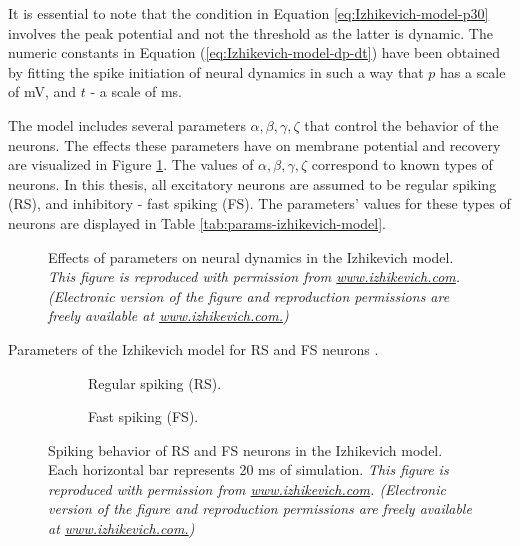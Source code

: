 It is essential to note that the condition in Equation \ref{eq:Izhikevich-model-p30} involves the peak potential and not the threshold as the latter is dynamic.
The numeric constants in Equation (\ref{eq:Izhikevich-model-dp-dt}) have been obtained by fitting the spike initiation of neural dynamics in such a way that $p$ has a scale of mV, and $t$ - a scale of ms.


The model includes several parameters $\alpha, \beta, \gamma, \zeta$ that control the behavior of the neurons. 
The effects these parameters have on membrane potential and recovery are visualized in Figure \ref{fig:neural-dynamics}. 
The values of $\alpha, \beta, \gamma, \zeta$ correspond to known types of neurons. In this thesis, all excitatory neurons are assumed to be regular spiking (RS), and inhibitory - fast spiking (FS). 
The parameters' values for these types of neurons  are displayed in Table \ref{tab:params-izhikevich-model}.

\begin{figure}[!htp]
    \centering
    
    \caption[Effects of Izhikevich parameters on neural dynamics]{Effects of parameters on neural dynamics in the Izhikevich model. {\it This figure is reproduced with permission from \url{www.izhikevich.com}. (Electronic version of the figure and reproduction permissions are freely available at \url{www.izhikevich.com.})}}
    \label{fig:neural-dynamics}
\end{figure}

\begin{table}[!htp] 
    \centering
    
    \caption[Izhikevich parameters: RS and FS neurons]{Parameters of the Izhikevich model for RS and FS neurons \cite{Izhikevich2003}.}
\label{tab:params-izhikevich-model}
\end{table}


\begin{figure}[!htp]
    \hspace*{-1.5cm} 
    \centering
    \begin{subfigure}[t]{0.3\textwidth}
        \centering
        
        \caption{Regular spiking (RS).}
        \label{fig:neuron-types-rs}
    \end{subfigure}
    \hspace{0.1\textwidth}
    \begin{subfigure}[t]{0.3\textwidth}
        \centering
        
        \caption{Fast spiking (FS).}
        \label{fig:neuron-types-fs}
    \end{subfigure}
    \caption[Spiking behavior of RS and FS neurons]{Spiking behavior of RS and FS neurons in the Izhikevich model. Each horizontal bar represents 20 ms of simulation. {\it This figure is reproduced with permission from \url{www.izhikevich.com}. (Electronic version of the figure and reproduction permissions are freely available at \url{www.izhikevich.com.})}}
    \label{fig:neuron-types}
\end{figure}

